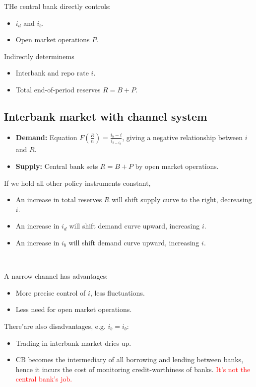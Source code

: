 THe central bank directly controls:
\begin{itemize}
    \item $i_d$ and $i_b$.
    \item Open market operations $P$.
\end{itemize}
Indirectly determinems
\begin{itemize}
    \item Interbank and repo rate $i$.
    \item Total end-of-period reserves $R = B+P$.
\end{itemize}

\subsection{Interbank market with channel system}
\begin{itemize}
    \item \textbf{Demand:} Equation $F\left(\frac{R}{n}\right) = \frac{i_b - i}{i_{b-i_d}}$, giving a negative relationship between $i$ and $R$.
    \item \textbf{Supply:} Central bank sets $R = B+P$ by open market operations.
\end{itemize}

If we hold all other policy instruments constant,
\begin{itemize}
    \item An increase in total reserves $R$ will shift supply curve to the right, decreasing $i$.
    \item An increase in $i_d$ will shift demand curve upward, increasing $i$.
    \item An increase in $i_b$ will shift demand curve upward, increasing $i$.
\end{itemize}

\begin{note}
    \ 

    A narrow channel has advantages:
    \begin{itemize}
        \item More precise control of $i$, less fluctuations.
        \item Less need for open market operations.
    \end{itemize}

    There'are also disadvantages, e.g. $i_b = i_b$:
    \begin{itemize}
        \item Trading in interbank market dries up.
        \item CB becomes the intermediary of all borrowing and lending between banks, hence it incurs the cost of monitoring credit-worthiness of banks. \textcolor{red}{It's not the central bank's job.}
    \end{itemize}
\end{note}

